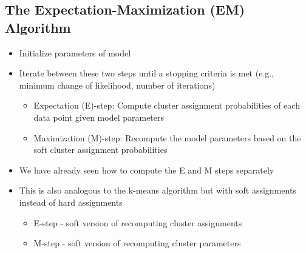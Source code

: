 \documentclass[10pt]{article}
\begin{document}
\subsection*{The Expectation-Maximization (EM) Algorithm}
\begin{itemize}
    \item Initialize parameters of model
    \item Iterate between these two steps until a stopping criteria is met (e.g., minimum change of likelihood, number of iterations)
    \begin{itemize}
        \item Expectation (E)-step: Compute cluster assignment probabilities of each data point given model parameters
        \item Maximization (M)-step: Recompute the model parameters based on the soft cluster assignment probabilities
    \end{itemize}
    \item We have already seen how to compute the E and M steps separately
    \item This is also analogous to the k-means algorithm but with soft assignments instead of hard assignments
    \begin{itemize}
        \item E-step - soft version of recomputing cluster assignments
        \item M-step - soft version of recomputing cluster parameters
    \end{itemize}
\end{itemize}
\end{document}

